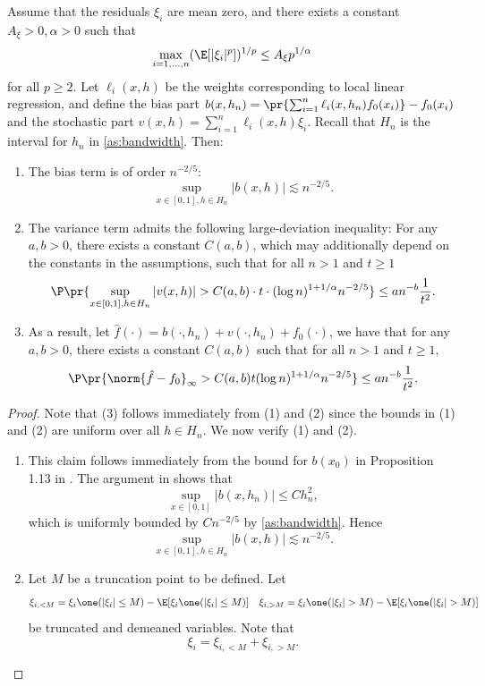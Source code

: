 \documentclass[12pt, reqno]{amsart}
\numberwithin{equation}{section}
\begin{document}
\begin{refsection}
\begin{appendices}
\begin{prop}
Assume that the residuals $\xi_i$ are mean zero, and there exists a constant $A_\xi > 0,
\alpha > 0$ such that \[
\max_{i=1,\ldots, n} (\E[|\xi_i|^p])^{1/p} \le A_\xi p^{1/\alpha}
\]
for all $p \ge 2$. Let $\ell_i(x,h)$ be the weights corresponding to local linear
regression, and define the bias part $b(x, h_n) = \pr{\sum_{i=1}^n \ell_i(x, h_n) f_0
(x_i)} - f_0(x_i)$
and the stochastic part $v(x, h) =
\sum_{i=1}^n \ell_i(x,h) \xi_i$. Recall that $H_n$ is the interval for $h_n$ in \cref{as:bandwidth}.
Then:
\begin{enumerate}
  \item The bias term is of order $n^{-2/5}$: \[
\sup_{x \in [0,1], h \in H_n} |b(x,h)| \lesssim n^{-2/5}.
  \]
  \item The variance term admits the following large-deviation inequality: For any
  $a, b > 0$, there exists
  a constant $C(a,b)$, which may additionally depend on the constants in the assumptions,
  such that for all $n > 1$ and $t \ge
  1$ \[
\P\pr{
  \sup_{x\in [0,1], h \in H_n} |v(x, h)| > C(a,b) \cdot t \cdot (\log n)^{1 + 1/\alpha} n^
  {-2/5}
} \le a n^{-b} \frac{1}{t^2}.
\]
\item As a result, let $\hat f(\cdot) = b(\cdot, h_n) + v(\cdot, h_n) + f_0(\cdot)$, we
have that for
any $a,b > 0$, there exists a constant $C(a,b)$ such that for all $n>1$ and $t \ge 1$, \[
\P\pr{
  \norm{\hat f - f_0}_{\infty} > C(a,b) t (\log n)^{1+1/\alpha} n^{-2/5}
} \le a n^{-b} \frac{1}{t^2}.
\]
\end{enumerate}
\end{prop}

\begin{proof}
Note that (3) follows immediately from (1) and (2) since the bounds in (1) and (2) are
uniform over all $h \in H_n$. We now verify (1) and (2).

\begin{enumerate}[wide]
  \item This claim follows immediately from the bound for $b(x_0)$ in Proposition 1.13 in
  \citet{tsybakov2008introduction}. The argument in \citet{tsybakov2008introduction} shows
  that \[
\sup_{x \in [0,1]}|b(x, h_n)| \le C h_n^2,
  \]
  which is uniformly bounded by $ C n^{-2/5}$ by \cref{as:bandwidth}. Hence \[
\sup_{x \in [0,1], h \in H_n} |b(x,h)| \lesssim n^{-2/5}.
  \]
  \item Let $M$ be a truncation point to be defined. Let \[\xi_{i, <M} = \xi_i \one(|\xi_i|
  \le
  M) - \E[\xi_i \one(|\xi_i|\le
  M)]
\quad \xi_{i, >M} = \xi_i \one(|\xi_i|
  >
  M) - \E[\xi_i \one(|\xi_i |>
  M)]
  \]
  be truncated and demeaned variables. Note that \[
\xi_i = \xi_{i, <M} + \xi_{i, >M}.
  \]


\end{enumerate}
\end{proof}
\end{appendices}
\end{refsection}
\end{document}
